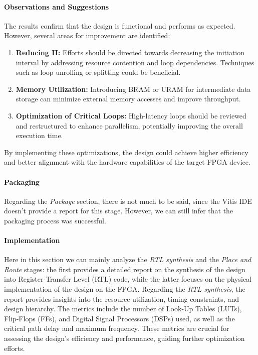 \documentclass{article}
\begin{document}
\paragraph{Observations and Suggestions}
The results confirm that the design is functional and performs as expected. However, several areas for improvement are identified:
\begin{enumerate}
    \item \textbf{Reducing II:} Efforts should be directed towards decreasing the initiation interval by addressing resource contention and loop dependencies. Techniques such as loop unrolling or splitting could be beneficial.
    \item \textbf{Memory Utilization:} Introducing BRAM or URAM for intermediate data storage can minimize external memory accesses and improve throughput.
    \item \textbf{Optimization of Critical Loops:} High-latency loops should be reviewed and restructured to enhance parallelism, potentially improving the overall execution time.
\end{enumerate}

By implementing these optimizations, the design could achieve higher efficiency and better alignment with the hardware capabilities of the target FPGA device.

\paragraph{Packaging}
Regarding the \textit{Package} section, there is  not much to be said, since the Vitis IDE doesn't provide a report for this stage. However, we can still infer that the packaging process was successful.

\paragraph{Implementation}

Here in this section we can mainly analyze the \textit{RTL synthesis} and the \textit{Place and Route} stages: the first provides a detailed report on the synthesis of the design into Register-Transfer Level (RTL) code, while the latter focuses on the physical implementation of the design on the FPGA.
Regarding the \textit{RTL synthesis}, the report provides insights into the resource utilization, timing constraints, and design hierarchy. The metrics include the number of Look-Up Tables (LUTs), Flip-Flops (FFs), and Digital Signal Processors (DSPs) used, as well as the critical path delay and maximum frequency. These metrics are crucial for assessing the design's efficiency and performance, guiding further optimization efforts.
\\\\ 
\end{document}
